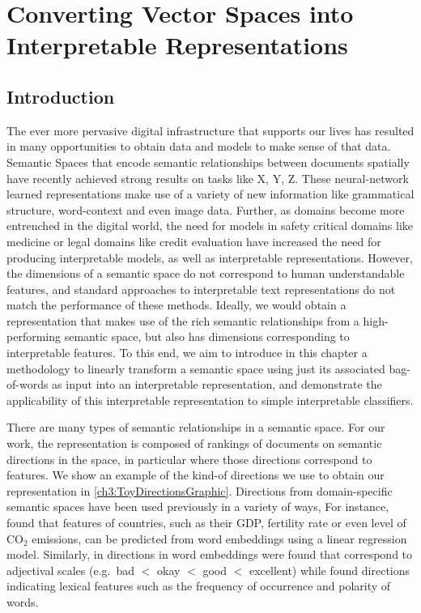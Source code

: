 \chapter{Converting Vector Spaces into Interpretable Representations}\label{Chapter3}


\section{Introduction}\label{chapter3:Introduction}
The ever more pervasive digital infrastructure that supports our lives has resulted in many opportunities to obtain data and models to make sense of that data. Semantic Spaces that encode semantic relationships between documents spatially have recently achieved strong results on tasks like X, Y, Z. These neural-network learned representations make use of a variety of new information like grammatical structure, word-context and even image data. Further, as domains become more entrenched in the digital world, the need for models in safety critical domains like medicine or legal domains like credit evaluation have increased the need for producing interpretable models, as well as interpretable representations. However, the dimensions of a semantic space do not correspond to human understandable features, and standard approaches to interpretable text representations do not match the performance of these methods. Ideally, we would obtain a representation that makes use of the rich semantic relationships from a high-performing semantic space, but also has dimensions corresponding to interpretable features. To this end, we aim to introduce in this chapter a methodology to linearly transform a semantic space using just its associated bag-of-words as input into an interpretable representation, and demonstrate the applicability of this interpretable representation to simple interpretable classifiers. 

There are many types of semantic relationships in a semantic space. For our work, the representation is composed of rankings of documents on semantic directions in the space, in particular where those directions correspond to features. We show an example of the kind-of directions we use to obtain our representation in \ref{ch3:ToyDirectionsGraphic}. Directions from domain-specific semantic spaces have been used previously in a variety of ways, For instance,  \cite{gupta2015distributional} found that features of countries, such as their GDP, fertility rate or even level of CO$_2$ emissions, can be predicted from word embeddings using a linear regression model. Similarly, in \cite{kim2013deriving} directions in word embeddings were found that correspond to adjectival scales (e.g.\ bad $<$ okay $<$ good $<$ excellent) while \cite{DBLP:conf/acl/RotheS16} found directions indicating lexical features such as the frequency of occurrence and polarity of words. 


